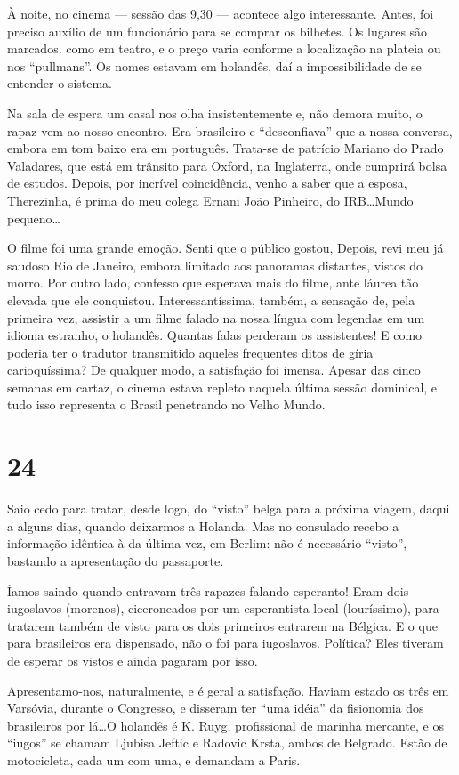 À noite, no cinema --- sessão das 9,30 --- acontece algo interessante. Antes, foi preciso auxílio de um funcionário para se comprar os bilhetes. Os lugares são marcados. como em teatro, e o preço varia conforme a localização na plateia ou nos ``pullmans''. Os nomes estavam em holandês, daí a impossibilidade de se entender o sistema.

Na sala de espera um casal nos olha insistentemente e, não demora muito, o rapaz vem ao nosso encontro. Era brasileiro e ``desconfiava'' que a nossa conversa, embora em tom baixo era em português. Trata-se de patrício Mariano do Prado Valadares, que está em trânsito para Oxford, na Inglaterra, onde cumprirá bolsa de estudos. Depois, por incrível coincidência, venho a saber que a esposa, Therezinha, é prima do meu colega Ernani João Pinheiro, do IRB\ldots Mundo pequeno\ldots

O filme foi uma grande emoção. Senti que o público gostou, Depois, revi meu já saudoso Rio de Janeiro, embora limitado aos panoramas distantes, vistos do morro. Por outro lado, confesso que esperava mais do filme, ante láurea tão elevada que ele conquistou. Interessantíssima, também, a sensação de, pela primeira vez, assistir a um filme falado na nossa língua com legendas em um idioma estranho, o holandês. Quantas falas perderam os assistentes! E como poderia ter o tradutor transmitido aqueles frequentes ditos de gíria carioquíssima? De qualquer modo, a satisfação foi imensa. Apesar das cinco semanas em cartaz, o cinema estava repleto naquela última sessão dominical, e tudo isso representa o Brasil penetrando no Velho Mundo.

\section*{24 \adfflatleafright {}}
Saio cedo para tratar, desde logo, do ``visto'' belga para a próxima viagem, daqui a alguns dias, quando deixarmos a Holanda. Mas no consulado recebo a informação idêntica à da última vez, em Berlim: não é necessário ``visto'', bastando a apresentação do passaporte.

Íamos saindo quando entravam três rapazes falando esperanto! Eram dois iugoslavos (morenos), ciceroneados por um esperantista local (louríssimo), para tratarem também de visto para os dois primeiros entrarem na Bélgica. E o que para brasileiros era dispensado, não o foi para iugoslavos. Política? Eles tiveram de esperar os vistos e ainda pagaram por isso.

Apresentamo-nos, naturalmente, e é geral a satisfação. Haviam estado os três em Varsóvia, durante o Congresso, e disseram ter ``uma idéia'' da fisionomia dos brasileiros por lá\ldots O holandês é K. Ruyg, profissional de marinha mercante, e os ``iugos'' se chamam Ljubisa Jeftic e Radovic Krsta, ambos de Belgrado. Estão de motocicleta, cada um com uma, e demandam a Paris.

